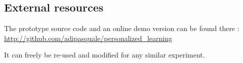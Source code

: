 \documentclass[a4paper,12pt]{article}
\begin{document}
\subsection{External resources}

The prototype source code and an online demo version can be found there :
\url{http://github.com/adipasquale/personalized_learning}

It can freely be re-used and modified for any similar experiment.

\newpage

\nocite{*}

\end{document}
